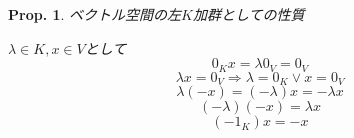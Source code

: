 \documentclass[a4paper,10pt,report]{amsart}
\theoremstyle{plain}
\newtheorem{prop}{Prop.}[section]
\theoremstyle{definition}
\theoremstyle{remark}
\begin{document}
\begin{leftbar}
    \begin{prop}\label{prop::characteristics_of_a_vector_space_as_a_left_K-module}ベクトル空間の左\(K\)加群としての性質\par
        \(\lambda\in K, x\in V\)として
        \begin{equation}
            0_{K}x=\lambda 0_{V}=0_{V}
        \end{equation}
        \begin{equation}
            \lambda x=0_{V}\Rightarrow \lambda=0_{K}\vee x=0_{V}
        \end{equation}
        \begin{equation}
            \lambda(-x)=(-\lambda)x=-\lambda x
        \end{equation}
        \begin{equation}
            (-\lambda)(-x)=\lambda x
        \end{equation}
        \begin{equation}
            (-1_{K})x=-x
        \end{equation}
    \end{prop}
\end{leftbar}
\end{document}
